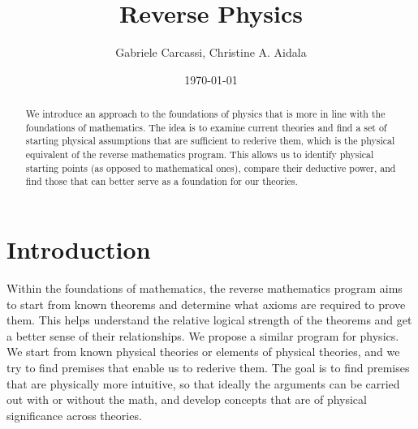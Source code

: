 \documentclass[10pt,twocolumn, nofootinbib]{revtex4-2}
\begin{document}
\title{Reverse Physics}
\author{Gabriele Carcassi, Christine A. Aidala}

\date{\today}


\begin{abstract}
We introduce an approach to the foundations of physics that is more in line with the foundations of mathematics. The idea is to examine current theories and find a set of starting physical assumptions that are sufficient to rederive them, which is the physical equivalent of the reverse mathematics program. This allows us to identify physical starting points (as opposed to mathematical ones), compare their deductive power, and find those that can better serve as a foundation for our theories.
\end{abstract}

\maketitle

\section{Introduction}

%	

Within the foundations of mathematics, the reverse mathematics program\cite{friedman1976systems,simpson2017reverse,stillwellreverse} aims to start from known theorems and determine what axioms are required to prove them. This helps understand the relative logical strength of the theorems and get a better sense of their relationships. We propose a similar program for physics. We start from known physical theories or elements of physical theories, and we try to find premises that enable us to rederive them. The goal is to find premises that are physically more intuitive, so that ideally the arguments can be carried out with or without the math, and develop concepts that are of physical significance across theories.
\end{document}
